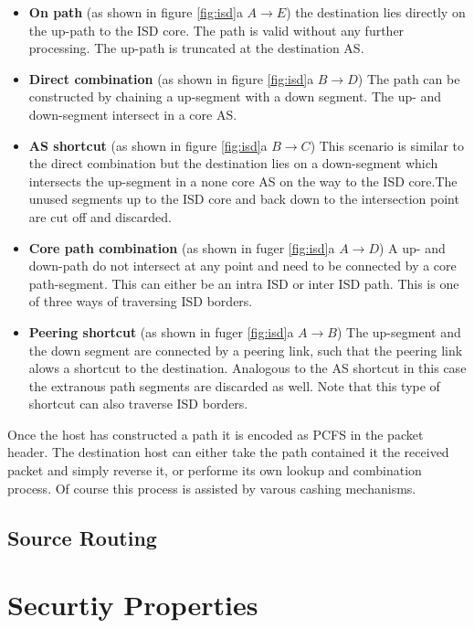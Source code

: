 \documentclass[../eva1_scion.tex]{subfiles}
\begin{document}
    \begin{itemize}
        \item \textbf{On path} (as shown in figure \ref{fig:isd}a $A \rightarrow E$) the destination lies directly on the up-path to the ISD core. The path is valid without any further processing. The up-path is truncated at the destination AS.
        \item \textbf{Direct combination} (as shown in figure \ref{fig:isd}a $B \rightarrow D$) The path can be constructed by chaining a up-segment with a down segment. The up- and down-segment intersect in a core AS.
        \item \textbf{AS shortcut} (as shown in figure \ref{fig:isd}a $B \rightarrow C$) This scenario is similar to the direct combination but the destination lies on a down-segment which intersects the up-segment in a none core AS on the way to the ISD core.The unused segments up to the ISD core and back down to the intersection point are cut off and discarded.
        \item \textbf{Core path combination} (as shown in fuger \ref{fig:isd}a $A \rightarrow D$) A up- and down-path do not intersect at any point and need to be connected by a core path-segment. This can either be an intra ISD or inter ISD path. This is one of three ways of traversing ISD borders.
        \item \textbf{Peering shortcut} (as shown in fuger \ref{fig:isd}a $A \rightarrow B$) The up-segment and the down segment are connected by a peering link, such that the peering link alows a shortcut to the destination. Analogous to the AS shortcut in this case the extranous path segments are discarded as well. Note that this type of shortcut can also traverse ISD borders.
    \end{itemize}

    Once the host has constructed a path it is encoded as PCFS in the packet header. The destination host can either take the path contained it the received packet and simply reverse it, or performe its own lookup and combination process. Of course this process is assisted by varous cashing mechanisms.

    \subsection{Source Routing}


    \section{Securtiy Properties}
\end{document}
